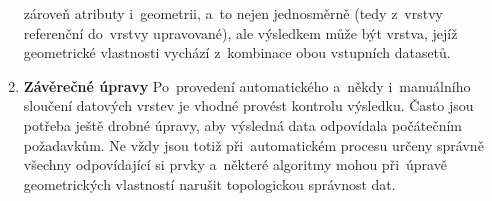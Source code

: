 \begin{enumerate}
      zároveň atributy i~geometrii, a~to nejen jednosměrně (tedy z~vrstvy referenční 
      do~vrstvy upravované), ale výsledkem může být vrstva, jejíž geometrické
      vlastnosti vychází z~kombinace obou vstupních datasetů.
  \item \textbf{Závěrečné úpravy}
      \subitem Po~provedení automatického a~někdy i~manuálního sloučení datových
      vrstev je vhodné provést kontrolu výsledku. Často jsou potřeba ještě drobné
      úpravy, aby výsledná data odpovídala počátečním požadavkům. Ne vždy jsou 
      totiž při~automatickém procesu určeny správně všechny odpovídající si prvky
      a~některé algoritmy mohou při~úpravě geometrických vlastností narušit 
      topologickou správnost dat.
\end{enumerate}
